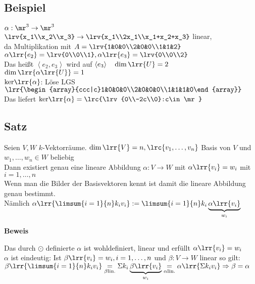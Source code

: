 \subsection{Beispiel}
	$\alpha:\mr^3\rightarrow\mr^3$\\
	$\lrv{x_1\\x_2\\x_3}\rightarrow\lrv{x_1\\2x_1\\x_1+x_2+x_3}$ linear,\\
	da Multiplikation mit $A=\lrv{1&0&0\\2&0&0\\1&1&2}$\\
	$\alpha\lrr{e_2}=\lrv{0\\0\\1}, \alpha\lrr{e_3}=\lrv{0\\0\\2}$\\
	Das heißt $\left\langle e_2,e_3\right\rangle$ wird auf $\left\langle e_3\right\rangle\quad\dim\lrr{U}=2$\\
	$\dim\lrr{\alpha\lrr{U}}=1$\\
	$\mbox{ker}\lrr{\alpha}$: Löse LGS $\lrr{\begin{array}{ccc|c}1&0&0&0\\2&0&0&0\\1&1&1&0\end{array}}$\\
	Das liefert $\mbox{ker}\lrr{\alpha}=\lrc{\lrv{0\\-2c\\0}:c\in\mr}$

\subsection{Satz}
	Seien $V,W$ $k$-Vektorräume. $\dim\lrr{V}=n, \lrc{v_1,\dots,v_n}$ Basis von $V$ und $w_1,\dots,w_n\in W$ beliebig\\
	Dann existiert genau eine lineare Abbildung $\alpha:V\rightarrow W$ mit $\alpha\lrr{v_i}=w_i$ mit $i=1,\dots,n$\\
	Wenn man die Bilder der Basisvektoren kennt ist damit die lineare Abbildung genau bestimmt.\\
	Nämlich $\alpha\lrr{\limsum{i=1}{n}k_iv_i}:=\limsum{i=1}{n}k_i\underbrace{\alpha\lrr{v_i}}_{\scriptstyle w_i}$

	\textbf{Beweis}

	Das durch $\odot$ definierte $\alpha$ ist wohldefiniert, linear und erfüllt $\alpha\lrr{v_i}=w_i$\\
	$\alpha$ ist eindeutig: Ist $\beta\lrr{v_i}=w_i, i=1,\dots, n$ und $\beta: V\rightarrow W$ linear so gilt:\\
	$\beta\lrr{\limsum{i=1}{n}k_iv_i}\underset{\scriptstyle\beta\mbox{\scriptsize  lin.}}{=}\Sigma k_i\underbrace{\beta\lrr{v_i}}_{\scriptstyle w_i}\underset{\scriptstyle\alpha\mbox{\scriptsize  lin.}}{=}\alpha\lrr{\Sigma k_iv_i}\Rightarrow\beta=\alpha$

